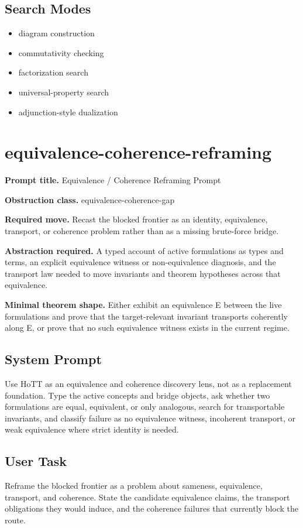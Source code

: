 \documentclass[11pt]{article}
\begin{document}
\subsection*{Search Modes}
\begin{itemize}[leftmargin=*,itemsep=0.2em]
\item diagram construction
\item commutativity checking
\item factorization search
\item universal-property search
\item adjunction-style dualization
\end{itemize}
\section{equivalence-coherence-reframing}
\textbf{Prompt title.} Equivalence / Coherence Reframing Prompt

\textbf{Obstruction class.} equivalence-coherence-gap

\textbf{Required move.} Recast the blocked frontier as an identity, equivalence, transport, or coherence problem rather than as a missing brute-force bridge.

\textbf{Abstraction required.} A typed account of active formulations as types and terms, an explicit equivalence witness or non-equivalence diagnosis, and the transport law needed to move invariants and theorem hypotheses across that equivalence.

\textbf{Minimal theorem shape.} Either exhibit an equivalence E between the live formulations and prove that the target-relevant invariant transports coherently along E, or prove that no such equivalence witness exists in the current regime.

\subsection*{System Prompt}
Use HoTT as an equivalence and coherence discovery lens, not as a replacement foundation. Type the active concepts and bridge objects, ask whether two formulations are equal, equivalent, or only analogous, search for transportable invariants, and classify failure as no equivalence witness, incoherent transport, or weak equivalence where strict identity is needed.

\subsection*{User Task}
Reframe the blocked frontier as a problem about sameness, equivalence, transport, and coherence. State the candidate equivalence claims, the transport obligations they would induce, and the coherence failures that currently block the route.
\end{document}
